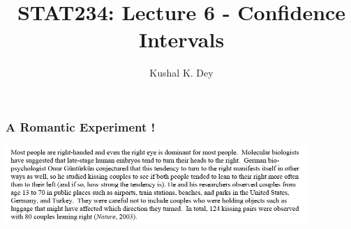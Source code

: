 \documentclass{beamer}\usepackage[]{graphicx}\usepackage[]{color}
\title{STAT234: Lecture 6 - Confidence Intervals}
\author{Kushal K. Dey}
\date{}
\begin{document}





\begin{frame}{}
\maketitle
\end{frame}


\begin{frame}[fragile]
\frametitle{A Romantic Experiment !}


\begin{center}
\includegraphics[width=11.5cm,height=5.3 cm]{KissingRight_StudyDescription.png}
\end{center}

\end{frame}
\end{document}
